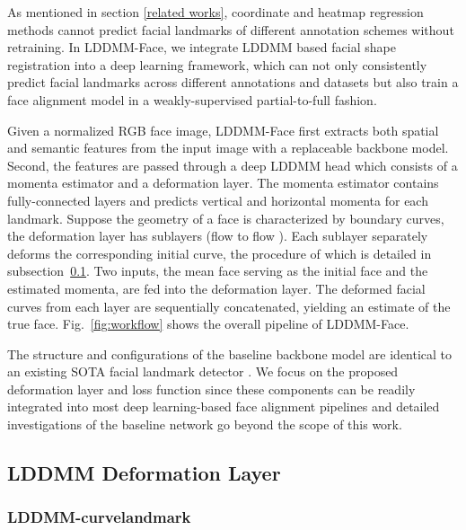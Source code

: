 \documentclass[10pt,twocolumn,letterpaper]{article}
\begin{document}
As mentioned in section \ref{related works}, coordinate and heatmap regression methods cannot predict facial landmarks of different annotation schemes without retraining. In LDDMM-Face, we integrate LDDMM based facial shape registration into a deep learning framework, which can not only consistently predict facial landmarks across different annotations and datasets but also train a face alignment model in a weakly-supervised partial-to-full fashion.

Given a normalized RGB face image, LDDMM-Face first extracts both spatial and semantic features from the input image with a replaceable backbone model. Second, the features are passed through a deep LDDMM head which consists of a momenta estimator and a deformation layer. The momenta estimator contains fully-connected layers and predicts vertical and horizontal momenta for each landmark. Suppose the geometry of a face is characterized by  boundary curves, the deformation layer has  sublayers (flow  to flow ). Each sublayer separately deforms the corresponding initial curve, the procedure of which is detailed in subsection~\ref{deformation layer}. Two inputs, the mean face serving as the initial face and the estimated momenta, are fed into the deformation layer. The deformed facial curves from each layer are sequentially concatenated, yielding an estimate of the true face. Fig.~\ref{fig:workflow} shows the overall pipeline of LDDMM-Face.

The structure and configurations of the baseline backbone model are identical to an existing SOTA facial landmark detector \cite{wang2020deep}. We focus on the proposed deformation layer and loss function since these components can be readily integrated into most deep learning-based face alignment pipelines and detailed investigations of the baseline network go beyond the scope of this work.

\subsection{LDDMM Deformation Layer}\label{deformation layer}

\subsubsection{LDDMM-curvelandmark}
\end{document}
